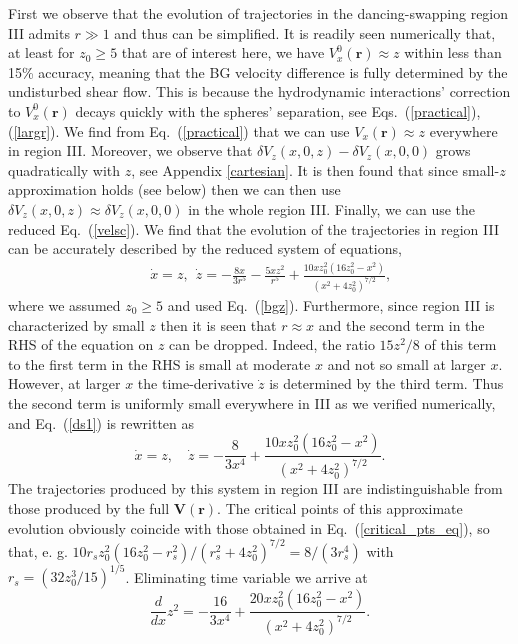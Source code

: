 First we observe that the evolution of trajectories in the dancing-swapping region III admits $r\gg 1$ and thus can be simplified. It is readily seen numerically that, at least for $z_0\geq 5$ that are of interest here, we have $V^0_x(\bm r)\approx z$ within less than 15\% accuracy, meaning that the BG velocity difference is fully determined by the undisturbed shear flow. This is because the hydrodynamic interactions' correction to $V^0_x(\bm r)$ decays quickly with the spheres' separation, see Eqs.~(\ref{practical}), (\ref{largr}). We find from Eq.~(\ref{practical}) that we can use $V_x(\bm r)\approx z$ everywhere in region III. Moreover, we observe that $\delta V_z(x, 0, z)-\delta V_z(x, 0, 0)$ grows quadratically with $z$, see Appendix \ref{cartesian}. It is then found that since small-$z$ approximation holds (see below) then we can then use $\delta V_z(x, 0, z)\approx \delta V_z(x, 0, 0)$ in the whole region III. Finally, we can use the reduced Eq.~(\ref{velsc}). We find that the evolution of the trajectories in region III can be accurately described by the reduced system of equations,
\begin{eqnarray}&&\!\!\!\!\!\!\!\!\!\!\!\!\!\!\!\!
\dot x=z,\ \ \dot z=-\frac{8x }{3r^5}\!-\!\frac{5 xz^2}{r^5}+\frac{10x z_0^2(16z_0^2\!-\!x^2)}{(x^2+4z_0^2)^{7/2}},
\label{ds1}
\end{eqnarray}
where we assumed $z_0\geq 5$ and used Eq.~(\ref{bgz}). Furthermore, since region III is characterized by small $z$ then it is seen that $r\approx x$ and the second term in the RHS of the equation on $z$ can be dropped. Indeed, the ratio $15 z^2/8$ of this term to the first term in the RHS is small at moderate $x$ and not so small at larger $x$. However, at larger $x$ the time-derivative $\dot z$ is determined by the third term. Thus the second term is uniformly small everywhere in III as we verified numerically, and Eq.~(\ref{ds1}) is rewritten as
\begin{equation}
\dot x = z,
\quad
\dot z=-\frac{8}{3x^4}+
\frac{10x z_0^2(16z_0^2-x^2)}{(x^2+4z_0^2)^{7/2}}.
\label{ds2}
\end{equation}
The trajectories produced by this system in region III are indistinguishable from those produced by the full $\bm V(\bm r)$. The critical points of this approximate evolution obviously coincide with those obtained in Eq.~(\ref{critical_pts_eq}), so that, e. g. $10r_s z_0^2(16z_0^2-r_s^2)/(r_s^2+4z_0^2)^{7/2}=8/(3r_s^4)$ with $r_s= \left(32 z_0^3/15\right)^{1/5}$. Eliminating time variable we arrive at
\begin{equation}
\frac{d}{dx}z^2=-\frac{16}{3x^4}+
\frac{20x z_0^2(16z_0^2-x^2)}{(x^2+4z_0^2)^{7/2}}.
\label{ds3}
\end{equation}
